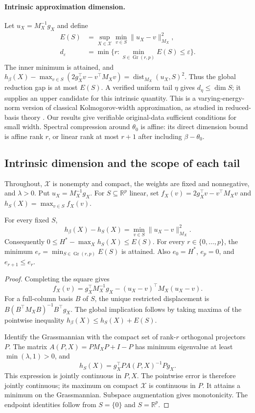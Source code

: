 \paragraph{Intrinsic approximation dimension.}
Let $u_X=M_X^{-1}g_X$ and define
\begin{align*}
 E(S)&=\sup_{X\in\mathcal X}\min_{v\in S}\|u_X-v\|_{M_X}^{2},\\
 d_\varepsilon&=\min\{r:\min_{S\in\operatorname{Gr}(r,p)}E(S)\leq\varepsilon\}.
\end{align*}
The inner minimum is attained, and $h_\beta(X)-\max_{v\in S}(2g_X^\top v-v^\top M_Xv)=\operatorname{dist}_{M_X}(u_X,S)^2$. Thus the global reduction gap is at most $E(S)$. A verified uniform tail $\eta$ gives $d_\eta\leq\dim S$; it supplies an upper candidate for this intrinsic quantity. This is a varying-energy-norm version of classical Kolmogorov-width approximation, as studied in reduced-basis theory \citep{binev2011}. Our results give verifiable original-data sufficient conditions for small width. Spectral compression around $\theta_0$ is affine: its direct dimension bound is affine rank $r$, or linear rank at most $r+1$ after including $\beta-\theta_0$.

\subsection{Intrinsic dimension and the scope of each tail}\label{app:dimension-v78}\label{app:dimension}
Throughout, $\mathcal X$ is nonempty and compact, the weights are fixed and nonnegative, and $\lambda>0$. Put $u_X=M_X^{-1}g_X$. For $S\subseteq\mathbb R^p$ linear, set $f_X(v)=2g_X^\top v-v^\top M_Xv$ and $h_S(X)=\max_{v\in S}f_X(v)$.

\begin{proposition}
For every fixed $S$,
\[
 h_\beta(X)-h_S(X)=\min_{v\in S}\|u_X-v\|_{M_X}^2.
\]
Consequently $0\leq H^*-\max_Xh_S(X)\leq E(S)$. For every $r\in\{0,\ldots,p\}$, the minimum $e_r=\min_{S\in\operatorname{Gr}(r,p)}E(S)$ is attained. Also $e_0=H^*$, $e_p=0$, and $e_{r+1}\leq e_r$.
\end{proposition}
\begin{proof}
Completing the square gives
\[
 f_X(v)=g_X^\top M_X^{-1}g_X-(u_X-v)^\top M_X(u_X-v).
\]
For a full-column basis $B$ of $S$, the unique restricted displacement is $B(B^\top M_XB)^{-1}B^\top g_X$. The global implication follows by taking maxima of the pointwise inequality $h_\beta(X)\leq h_S(X)+E(S)$.

Identify the Grassmannian with the compact set of rank-$r$ orthogonal projectors $P$. The matrix $A(P,X)=PM_XP+I-P$ has minimum eigenvalue at least $\min(\lambda,1)>0$, and
\[
 h_S(X)=g_X^\top P A(P,X)^{-1}P g_X.
\]
This expression is jointly continuous in $P,X$. The pointwise error is therefore jointly continuous; its maximum on compact $\mathcal X$ is continuous in $P$. It attains a minimum on the Grassmannian. Subspace augmentation gives monotonicity. The endpoint identities follow from $S=\{0\}$ and $S=\mathbb R^p$.
\end{proof}

